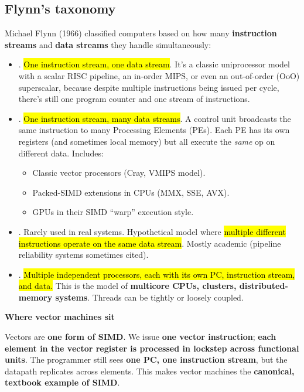 \subsection{Flynn's taxonomy}

Michael Flynn (1966) classified computers based on how many \textbf{instruction streams} and \textbf{data streams} they handle simultaneously:
\begin{itemize}
    \item {}. \hl{One instruction stream, one data stream}. It's a classic uniprocessor model with a scalar RISC pipeline, an in-order MIPS, or even an out-of-order (OoO) superscalar, because despite multiple instructions being issued per cycle, there's still one program counter and one stream of instructions.

    \item {}. \hl{One instruction stream, many data streams}. A control unit broadcasts the same instruction to many Processing Elements (PEs). Each PE has its own registers (and sometimes local memory) but all execute the \emph{same} op on different data. Includes:
    \begin{itemize}
        \item Classic vector processors (Cray, VMIPS model).
        \item Packed-SIMD extensions in CPUs (MMX, SSE, AVX).
        \item GPUs in their SIMD ``warp'' execution style.
    \end{itemize}

    \item {}. Rarely used in real systems. Hypothetical model where \hl{multiple different instructions operate on the same data stream}. Mostly academic (pipeline reliability systems sometimes cited).

    \item {}. \hl{Multiple independent processors, each with its own PC, instruction stream, and data.} This is the model of \textbf{multicore CPUs, clusters, distributed-memory systems}. Threads can be tightly or loosely coupled.
\end{itemize}

\highspace
\begin{flushleft}
    \textcolor{Green3}{ \textbf{Where vector machines sit}}
\end{flushleft}
Vectors are \textbf{one form of SIMD}. We issue \textbf{one vector instruction}; \textbf{each element in the vector register is processed in lockstep across functional units}. The programmer still sees \textbf{one PC, one instruction stream}, but the datapath replicates across elements. This makes vector machines the \textbf{canonical, textbook example of SIMD}.


